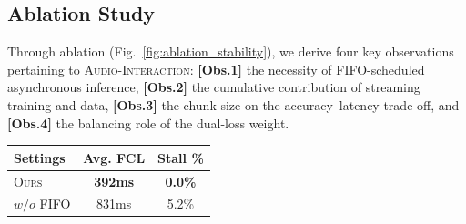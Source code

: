 \documentclass{llmxive}
\begin{document}
\subsection{Ablation Study}
\vspace{-4mm}
\begin{minipage}[t]{0.60\textwidth}
\vspace{0mm}
Through ablation (Fig.~\ref{fig:ablation_stability}), we derive four key observations pertaining to \textsc{Audio-Interaction}:
\textbf{[Obs.1]} the necessity of FIFO-scheduled asynchronous inference,
\textbf{[Obs.2]} the cumulative contribution of streaming training and data, \textbf{[Obs.3]} the chunk size on the accuracy--latency trade-off, and
\textbf{[Obs.4]} the balancing role of the dual-loss weight.
\end{minipage}
\hfill
\begin{minipage}[t]{0.38\textwidth}
\small
\centering
\vspace{2mm}
\vspace{-2mm}
\label{tab:fifo_inference}
\begin{tabular}{lcc}
\toprule
\textbf{Settings} & \textbf{Avg. FCL} & \textbf{Stall \%} \\
\midrule
\textsc{Ours} & \textbf{392ms} & \textbf{0.0\%} \\
\quad $w/o$ FIFO & 831ms & 5.2\% \\
\bottomrule
\end{tabular}
\end{minipage}
\end{document}
